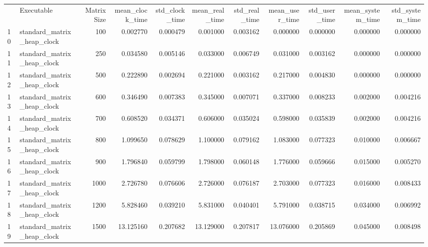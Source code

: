 \begin{tabular}{llrrrrrrrrr}
 & Executable & Matrix Size & mean_clock_time & std_clock_time & mean_real_time & std_real_time & mean_user_time & std_user_time & mean_system_time & std_system_time \\
10 & standard_matrix_heap_clock & 100 & 0.002770 & 0.000479 & 0.001000 & 0.003162 & 0.000000 & 0.000000 & 0.000000 & 0.000000 \\
11 & standard_matrix_heap_clock & 250 & 0.034580 & 0.005146 & 0.033000 & 0.006749 & 0.031000 & 0.003162 & 0.000000 & 0.000000 \\
12 & standard_matrix_heap_clock & 500 & 0.222890 & 0.002694 & 0.221000 & 0.003162 & 0.217000 & 0.004830 & 0.000000 & 0.000000 \\
13 & standard_matrix_heap_clock & 600 & 0.346490 & 0.007383 & 0.345000 & 0.007071 & 0.337000 & 0.008233 & 0.002000 & 0.004216 \\
14 & standard_matrix_heap_clock & 700 & 0.608520 & 0.034371 & 0.606000 & 0.035024 & 0.598000 & 0.035839 & 0.002000 & 0.004216 \\
15 & standard_matrix_heap_clock & 800 & 1.099650 & 0.078629 & 1.100000 & 0.079162 & 1.083000 & 0.077323 & 0.010000 & 0.006667 \\
16 & standard_matrix_heap_clock & 900 & 1.796840 & 0.059799 & 1.798000 & 0.060148 & 1.776000 & 0.059666 & 0.015000 & 0.005270 \\
17 & standard_matrix_heap_clock & 1000 & 2.726780 & 0.076606 & 2.726000 & 0.076187 & 2.703000 & 0.077323 & 0.016000 & 0.008433 \\
18 & standard_matrix_heap_clock & 1200 & 5.828460 & 0.039210 & 5.831000 & 0.040401 & 5.791000 & 0.038715 & 0.034000 & 0.006992 \\
19 & standard_matrix_heap_clock & 1500 & 13.125160 & 0.207682 & 13.129000 & 0.207817 & 13.076000 & 0.205869 & 0.045000 & 0.008498 \\
\end{tabular}
